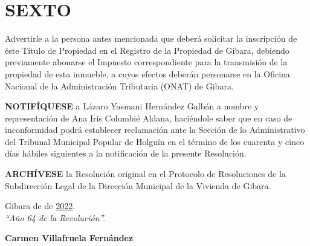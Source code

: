 \documentclass[11pt,letterpaper]{article}
\begin{document}
    \section{SEXTO}
        Advertirle a la persona antes mencionada que deberá solicitar la inscripción de éste Título de Propiedad en el Registro de la Propiedad de Gibara, debiendo previamente abonarse el Impuesto correspondiente para la transmisión de la propiedad de esta inmueble, a cuyos efectos deberán personarse en la Oficina Nacional de la Administración Tributaria (ONAT) de Gibara.\\ \par
    \noindent
    \textbf{NOTIFÍQUESE} a Lázaro Yasmani Hernández Galbán a nombre y representación de Ana Iris Columbié Aldana, haciéndole saber que en caso de inconformidad podrá establecer reclamación ante la Sección de lo Administrativo del Tribunal Municipal Popular de Holguín en el término de los cuarenta y cinco días hábiles siguientes a la notificación de la presente Resolución.\\ \par
    \noindent
    \textbf{ARCHÍVESE} la Resolución original en el Protocolo de Resoluciones de la Subdirección Legal de la Dirección Municipal de la Vivienda de Gibara.

    \begin{flushleft}
        \textrm{Gibara \underline{\hspace {1cm}} de \underline{\hspace {3cm}} de \underline{2022}.} \\ 
        \textit{“Año 64 de la Revolución”.}\\
                           
    \end{flushleft}
    \vspace{3cm}
    \noindent
    \textbf{Carmen Villafruela Fernández}
\end{document}
